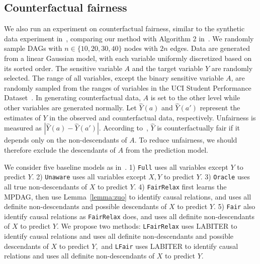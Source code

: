 \documentclass{article}
\begin{document}
\subsection{Counterfactual fairness}

We also run an experiment on counterfactual fairness, similar to the synthetic data experiment in~\citep{zuo2022counterfactual}, comparing our method with Algorithm 2 in~\citep{zuo2022counterfactual}. We randomly sample DAGs with $n\in\{10,20,30,40\}$ nodes with $2n$ edges. Data are generated from a linear Gaussian model, with each variable uniformly discretized based on its sorted order. The sensitive variable $A$ and the target variable $Y$ are randomly selected. The range of all variables, except the binary sensitive variable $A$, are randomly sampled from the ranges of variables in the UCI Student Performance Dataset~\citep{cortez2008using}. In generating counterfactual data, $A$ is set to the other level while other variables are generated normally. Let $\hat{Y}(a)$ and $\hat{Y}(a')$ represent the estimates of $Y$ in the observed and counterfactual data, respectively. Unfairness is measured as $|\hat{Y}(a) - \hat{Y}(a')|$. According to~\citet{kusner2017counterfactual}, $\hat{Y}$ is counterfactually fair if it depends only on the non-descendants of $A$. To reduce unfairness, we should therefore exclude the descendants of $A$ from the prediction model.

We consider five baseline models as in~\citep{zuo2022counterfactual}. 1) \texttt{Full} uses all variables except $Y$ to predict $Y.$ 2) \texttt{Unaware} uses all variables except $X,Y$ to predict $Y.$ 3) \texttt{Oracle} uses all true non-descendants of $X$ to predict $Y.$ 4) \texttt{FairRelax} first learns the MPDAG, then use Lemma~\ref{lemma:zuo} to identify causal relations, and uses all definite non-descendants and possible descendants of $X$ to predict $Y.$ 5) \texttt{Fair} also identify causal relations as \texttt{FairRelax} does, and uses all definite non-descendants of $X$ to predict $Y.$ We propose two methods: \texttt{LFairRelax} uses LABITER to identify causal relations and uses all definite non-descendants and possible descendants of $X$ to predict $Y,$ and \texttt{LFair} uses LABITER to identify causal relations and uses all definite non-descendants of $X$ to predict $Y.$
\end{document}
